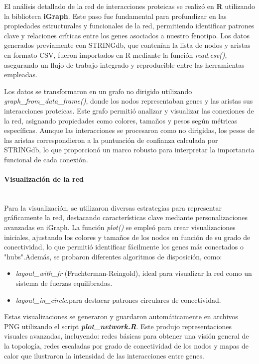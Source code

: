 El análisis detallado de la red de interacciones proteicas se realizó en \textbf{R} utilizando la biblioteca \textbf{iGraph}. Este paso fue fundamental para profundizar en las propiedades estructurales y funcionales de la red, permitiendo identificar patrones clave y relaciones críticas entre los genes asociados a nuestro fenotipo. Los datos generados previamente con STRINGdb, que contenían la lista de nodos y aristas en formato CSV, fueron importados en R mediante la función \textit{read.csv()}, asegurando un flujo de trabajo integrado y reproducible entre las herramientas empleadas.

Los datos se transformaron en un grafo no dirigido utilizando \textit{graph\_from\_data\_frame()}, donde los nodos representaban genes y las aristas sus interacciones proteicas. Este grafo permitió analizar y visualizar las conexiones de la red, asignando propiedades como colores, tamaños y pesos según métricas específicas. Aunque las interacciones se procesaron como no dirigidas, los pesos de las aristas correspondieron a la puntuación de confianza calculada por STRINGdb, lo que proporcionó un marco robusto para interpretar la importancia funcional de cada conexión.

\paragraph{Visualización de la red} \mbox{}\\

Para la visualización, se utilizaron diversas estrategias para representar gráficamente la red, destacando características clave mediante personalizaciones avanzadas en iGraph. La función \textit{plot()} se empleó para crear visualizaciones iniciales, ajustando los colores y tamaños de los nodos en función de su grado de conectividad, lo que permitió identificar fácilmente los genes más conectados o "hubs".Además, se probaron diferentes algoritmos de disposición, como:

\begin{itemize}
	\item \textit{layout\_with\_fr} (Fruchterman-Reingold), ideal para visualizar la red como un sistema de fuerzas equilibradas.
	\item \textit{layout\_in\_circle},para destacar patrones circulares de conectividad.
\end{itemize}

Estas visualizaciones se generaron y guardaron automáticamente en archivos PNG utilizando el script \textbf{\textit{plot\_network.R}}. Este produjo representaciones visuales avanzadas, incluyendo: redes básicas para obtener una visión general de la topología, redes escaladas por grado de conectividad de los nodos y mapas de calor que ilustraron la intensidad de las interacciones entre genes.

